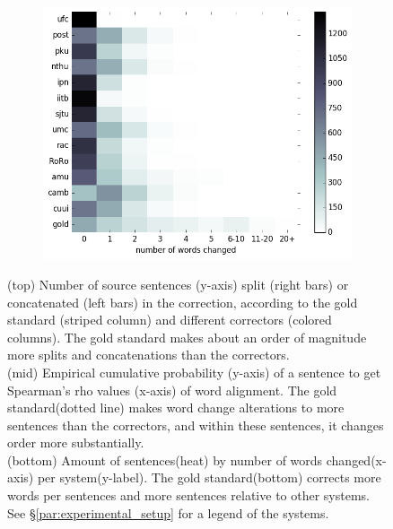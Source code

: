 \documentclass[letter,11pt]{article}
\newcommand{\com}[1]{}
\begin{document}
\begin{figure}[tbp]
		\begin{subfigure}[]{0.4\textwidth}
			\includegraphics[width = \textwidth]{words_differences_heat}
			\com{\caption{Amount of sentences(heat) by number of words changed(x-axis) per system(y-label). The gold standard(bottom) corrects more words per sentences and more sentences relative to other systems.\label{fig:words_changed}}}
		\end{subfigure}
		\caption{(top) Number of source sentences (y-axis) split 
			(right bars) or concatenated (left bars) in the correction, according to the gold standard (striped column) and different correctors (colored columns). The gold standard makes about an order of magnitude more splits and concatenations than the correctors.\\
			(mid) Empirical cumulative probability (y-axis) of a sentence to get Spearman's rho values (x-axis) of word alignment. The gold standard(dotted line) makes word change alterations to more sentences than the correctors, and within these sentences, it changes order more substantially.\\
			(bottom) Amount of sentences(heat) by number of words changed(x-axis) per system(y-label). The gold standard(bottom) corrects more words per sentences and more sentences relative to other systems.\\
			See \S\ref{par:experimental_setup} for a legend
			of the systems.\label{fig:over-conservatism}}
		

\end{figure}
\end{document}
